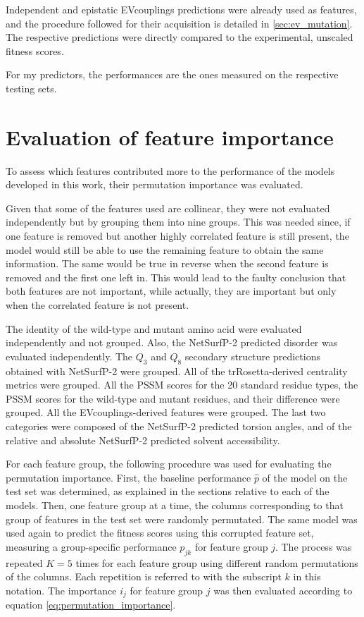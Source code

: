 Independent and epistatic EVcouplings predictions were already used as features, and the procedure followed for their acquisition is detailed in \autoref{sec:ev_mutation}.
The respective predictions were directly compared to the experimental, unscaled fitness scores.

For my predictors, the performances are the ones measured on the respective testing sets.

\section{Evaluation of feature importance}\label{sec:mm_feature_importance}
To assess which features contributed more to the performance of the models developed in this work, their permutation importance was evaluated.

Given that some of the features used are collinear, they were not evaluated independently but by grouping them into nine groups.
This was needed since, if one feature is removed but another highly correlated feature is still present, the model would still be able to use the remaining feature to obtain the same information.
The same would be true in reverse when the second feature is removed and the first one left in.
This would lead to the faulty conclusion that both features are not important, while actually, they are important but only when the correlated feature is not present.

The identity of the wild-type and mutant amino acid were evaluated independently and not grouped.
Also, the NetSurfP-2 predicted disorder was evaluated independently.
The $Q_3$ and $Q_8$ secondary structure predictions obtained with NetSurfP-2 were grouped.
All of the trRosetta-derived centrality metrics were grouped.
All the PSSM scores for the \num{20} standard residue types, the PSSM scores for the wild-type and mutant residues, and their difference were grouped.
All the EVcouplings-derived features were grouped.
The last two categories were composed of the NetSurfP-2 predicted torsion angles, and of the relative and absolute NetSurfP-2 predicted solvent accessibility.

For each feature group, the following procedure was used for evaluating the permutation importance.
First, the baseline performance $\hat{p}$ of the model on the test set was determined, as explained in the sections relative to each of the models.
Then, one feature group at a time, the columns corresponding to that group of features in the test set were randomly permutated.
The same model was used again to predict the fitness scores using this corrupted feature set, measuring a group-specific performance $p_{jk}$ for feature group $j$.
The process was repeated $K=5$ times for each feature group using different random permutations of the columns.
Each repetition is referred to with the subscript $k$ in this notation.
The importance $i_j$ for feature group $j$ was then evaluated according to equation \autoref{eq:permutation_importance}.

